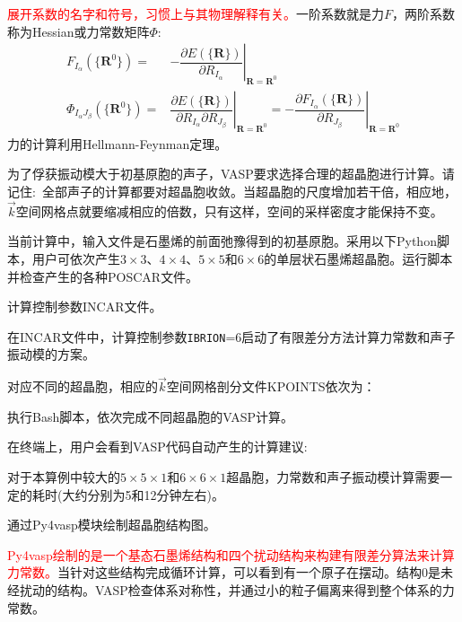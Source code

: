\textcolor{red}{展开系数的名字和符号，习惯上与其物理解释有关。}一阶系数就是力$F$，两阶系数称为\textrm{Hessian}或力常数矩阵$\Phi$:
\begin{displaymath}
	\begin{aligned}
		F_{I_{\alpha}}(\{\mathbf{R}^0\})=&-\left.\dfrac{\partial E(\{\mathbf{R}\})}{\partial R_{I_{\alpha}}}\right|_{\mathbf{R}=\mathbf{R}^0}\\
		\Phi_{I_{\alpha}J_{\beta}}(\{\mathbf{R}^0\})=&\left.\dfrac{\partial E(\{\mathbf{R}\})}{\partial R_{I_{\alpha}}\partial R_{J_{\beta}}}\right|_{\mathbf{R}=\mathbf{R}^0}=-\left.\dfrac{\partial F_{I_{\alpha}}(\{\mathbf{R}\})}{\partial R_{J_{\beta}}}\right|_{\mathbf{R}=\mathbf{R}^0}
	\end{aligned}
\end{displaymath}
力的计算利用\textrm{Hellmann-Feynman}定理。

为了俘获振动模大于初基原胞的声子，\textrm{VASP}要求选择合理的超晶胞进行计算。请记住:~全部声子的计算都要对超晶胞收敛。当超晶胞的尺度增加若干倍，相应地，$\vec k$空间网格点就要缩减相应的倍数，只有这样，空间的采样密度才能保持不变。

当前计算中，输入文件是石墨烯的前面弛豫得到的初基原胞。采用以下\textrm{Python}脚本，用户可依次产生$3\times3$、$4\times4$、$5\times5$和$6\times6$的单层状石墨烯超晶胞。运行脚本并检查产生的各种\textrm{POSCAR}文件。

计算控制参数\textrm{INCAR}文件。

在\textrm{INCAR}文件中，计算控制参数\texttt{IBRION}=6启动了有限差分方法计算力常数和声子振动模的方案。

对应不同的超晶胞，相应的$\vec k$空间网格剖分文件\textrm{KPOINTS}依次为：

执行\textrm{Bash}脚本，依次完成不同超晶胞的\textrm{VASP}计算。

在终端上，用户会看到\textrm{VASP}代码自动产生的计算建议:

对于本算例中较大的$5\times5\times1$和$6\times6\times1$超晶胞，力常数和声子振动模计算需要一定的耗时(大约分别为5和12分钟左右)。%


通过\textrm{Py4vasp}模块绘制超晶胞结构图。

\textcolor{red}{\textrm{Py4vasp}绘制的是一个基态石墨烯结构和四个扰动结构来构建有限差分算法来计算力常数。}当针对这些结构完成循环计算，可以看到有一个原子在摆动。结构0是未经扰动的结构。\textrm{VASP}检查体系对称性，并通过小的粒子偏离来得到整个体系的力常数。

